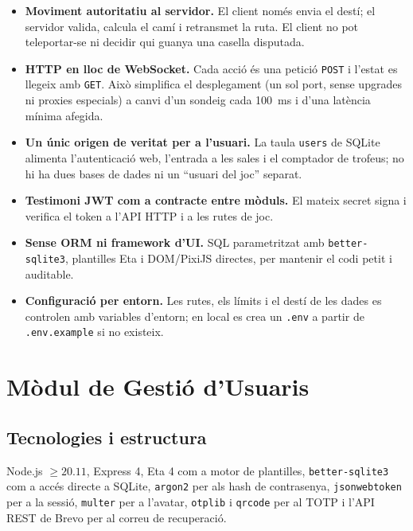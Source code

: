 \documentclass[11pt,a4paper]{article}
\begin{document}
\begin{itemize}
  \item \textbf{Moviment autoritatiu al servidor.} El client només envia el destí; el
        servidor valida, calcula el camí i retransmet la ruta. El client no pot
        teleportar-se ni decidir qui guanya una casella disputada.
  \item \textbf{HTTP en lloc de WebSocket.} Cada acció és una petició \texttt{POST} i
        l'estat es llegeix amb \texttt{GET}. Això simplifica el desplegament (un sol
        port, sense upgrades ni proxies especials) a canvi d'un sondeig cada 100~ms i
        d'una latència mínima afegida.
  \item \textbf{Un únic origen de veritat per a l'usuari.} La taula \texttt{users} de
        SQLite alimenta l'autenticació web, l'entrada a les sales i el comptador de
        trofeus; no hi ha dues bases de dades ni un \enquote{usuari del joc} separat.
  \item \textbf{Testimoni JWT com a contracte entre mòduls.} El mateix secret signa i
        verifica el token a l'API HTTP i a les rutes de joc.
  \item \textbf{Sense ORM ni framework d'UI.} SQL parametritzat amb
        \texttt{better-sqlite3}, plantilles Eta i DOM/PixiJS directes, per mantenir el
        codi petit i auditable.
  \item \textbf{Configuració per entorn.} Les rutes, els límits i el destí de les dades
        es controlen amb variables d'entorn; en local es crea un \texttt{.env} a partir
        de \texttt{.env.example} si no existeix.
\end{itemize}

\section{Mòdul de Gestió d'Usuaris}
\label{sec:usuaris}

\subsection{Tecnologies i estructura}

Node.js $\geq 20.11$, Express 4, Eta 4 com a motor de plantilles,
\texttt{better-sqlite3} com a accés directe a SQLite, \texttt{argon2} per als hash de
contrasenya, \texttt{jsonwebtoken} per a la sessió, \texttt{multer} per a l'avatar,
\texttt{otplib} i \texttt{qrcode} per al TOTP i l'API REST de Brevo per al correu de
recuperació.
\end{document}
